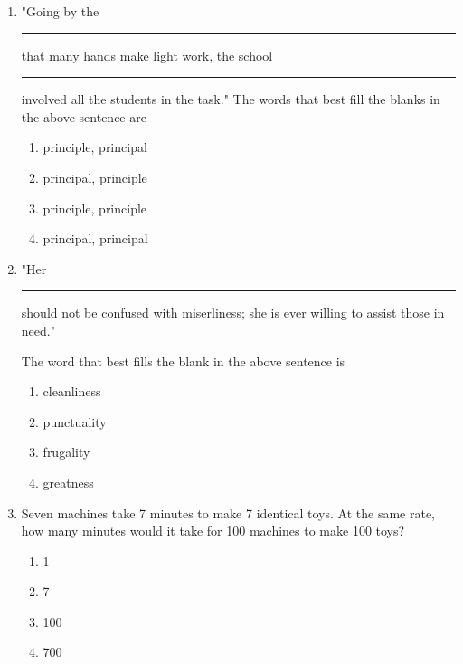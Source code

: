 \documentclass[journal]{IEEEtran}
\numberwithin{equation}{enumi}
\numberwithin{figure}{enumi}
\begin{document}
\begin{enumerate}
	\item
	"Going by the \rule{1cm}{0.1pt} that many hands make light work, the school \rule{1cm}{0.1pt} involved all the students in the task."
	The words that best fill the blanks in the above sentence are

	\hfill{}

	\begin{multicols}{2}
		\begin{enumerate}
			\item principle, principal
			\item principal, principle
			\item principle, principle
			\item principal, principal
		\end{enumerate}
	\end{multicols}

	\item 
	"Her \rule{1cm}{0.1pt} should not be confused with miserliness; she is ever willing to assist those in need."

	The word that best fills the blank in the above sentence is
	
	\hfill{}

	\begin{multicols}{2}
		\begin{enumerate}
			\item cleanliness 
			\item punctuality
			\item frugality
			\item greatness
		\end{enumerate}
	\end{multicols}

	\item
	Seven machines take 7 minutes to make 7 identical toys. At the same rate, how many minutes would it take for 100 machines to make 100 toys?

	\hfill{}

	\begin{multicols}{4}
		\begin{enumerate}
			\item 1
			\item 7
			\item 100
			\item 700
		\end{enumerate}
	\end{multicols}


\end{enumerate}
\end{document}
